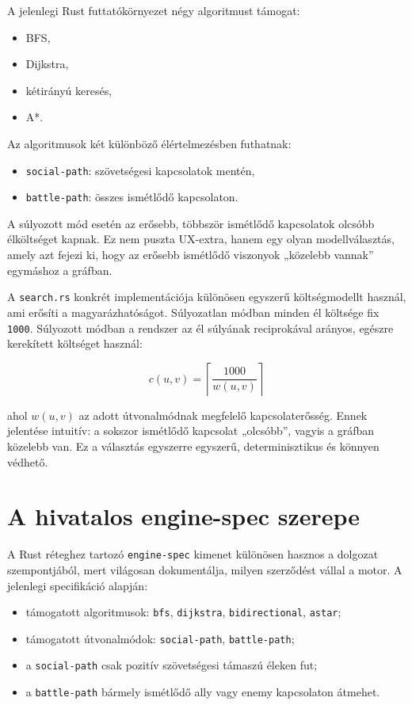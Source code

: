 \documentclass[a4paper,12pt]{report}
\begin{document}
A jelenlegi Rust futtatókörnyezet négy algoritmust támogat:

\begin{itemize}
    \item BFS,
    \item Dijkstra,
    \item kétirányú keresés,
    \item A*.
\end{itemize}

Az algoritmusok két különböző élértelmezésben futhatnak:

\begin{itemize}
    \item \texttt{social-path}: szövetségesi kapcsolatok mentén,
    \item \texttt{battle-path}: összes ismétlődő kapcsolaton.
\end{itemize}

A súlyozott mód esetén az erősebb, többször ismétlődő kapcsolatok olcsóbb élköltséget kapnak. Ez nem puszta UX-extra, hanem egy olyan modellválasztás, amely azt fejezi ki, hogy az erősebb ismétlődő viszonyok „közelebb vannak” egymáshoz a gráfban.

A \texttt{search.rs} konkrét implementációja különösen egyszerű költségmodellt használ, ami erősíti a magyarázhatóságot. Súlyozatlan módban minden él költsége fix \texttt{1000}. Súlyozott módban a rendszer az él súlyának reciprokával arányos, egészre kerekített költséget használ:

\begin{equation}
c(u,v)=\left\lceil \frac{1000}{w(u,v)} \right\rceil
\end{equation}

ahol $w(u,v)$ az adott útvonalmódnak megfelelő kapcsolaterősség. Ennek jelentése intuitív: a sokszor ismétlődő kapcsolat „olcsóbb”, vagyis a gráfban közelebb van. Ez a választás egyszerre egyszerű, determinisztikus és könnyen védhető.

\section{A hivatalos engine-spec szerepe}

A Rust réteghez tartozó \texttt{engine-spec} kimenet különösen hasznos a dolgozat szempontjából, mert világosan dokumentálja, milyen szerződést vállal a motor. A jelenlegi specifikáció alapján:

\begin{itemize}
    \item támogatott algoritmusok: \texttt{bfs}, \texttt{dijkstra}, \texttt{bidirectional}, \texttt{astar};
    \item támogatott útvonalmódok: \texttt{social-path}, \texttt{battle-path};
    \item a \texttt{social-path} csak pozitív szövetségesi támaszú éleken fut;
    \item a \texttt{battle-path} bármely ismétlődő ally vagy enemy kapcsolaton átmehet.
\end{itemize}
\end{document}
